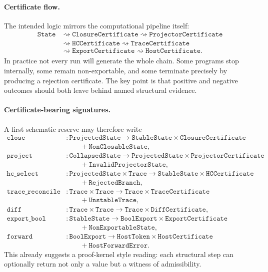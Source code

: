 \paragraph{Certificate flow.}
The intended logic mirrors the computational pipeline itself:
\[
\begin{aligned}
\texttt{State}
&\rightsquigarrow
\texttt{ClosureCertificate}
\rightsquigarrow
\texttt{ProjectorCertificate}\\
&\rightsquigarrow
\texttt{HCCertificate}
\rightsquigarrow
\texttt{TraceCertificate}\\
&\rightsquigarrow
\texttt{ExportCertificate}
\rightsquigarrow
\texttt{HostCertificate}.
\end{aligned}
\]
In practice not every run will generate the whole chain. Some programs stop internally, some remain non-exportable, and some terminate precisely by producing a rejection certificate. The key point is that positive and negative outcomes should both leave behind named structural evidence.

\paragraph{Certificate-bearing signatures.}
A first schematic reserve may therefore write
{\scriptsize
\begin{align*}
\texttt{close} &: \texttt{ProjectedState} \to \texttt{StableState}\times\texttt{ClosureCertificate}\\
&\qquad + \texttt{NonClosableState},\\
\texttt{project} &: \texttt{CollapsedState} \to \texttt{ProjectedState}\times\texttt{ProjectorCertificate}\\
&\qquad + \texttt{InvalidProjectorState},\\
\texttt{hc\_select} &: \texttt{ProjectedState}\times\texttt{Trace} \to \texttt{StableState}\times\texttt{HCCertificate}\\
&\qquad + \texttt{RejectedBranch},\\
\texttt{trace\_reconcile} &: \texttt{Trace}\times\texttt{Trace} \to \texttt{Trace}\times\texttt{TraceCertificate}\\
&\qquad + \texttt{UnstableTrace},\\
\texttt{diff} &: \texttt{Trace}\times\texttt{Trace} \to \texttt{Trace}\times\texttt{DiffCertificate},\\
\texttt{export\_bool} &: \texttt{StableState} \to \texttt{BoolExport}\times\texttt{ExportCertificate}\\
&\qquad + \texttt{NonExportableState},\\
\texttt{forward} &: \texttt{BoolExport} \to \texttt{HostToken}\times\texttt{HostCertificate}\\
&\qquad + \texttt{HostForwardError}.
\end{align*}
}
This already suggests a proof-kernel style reading: each structural step can optionally return not only a value but a witness of admissibility.

